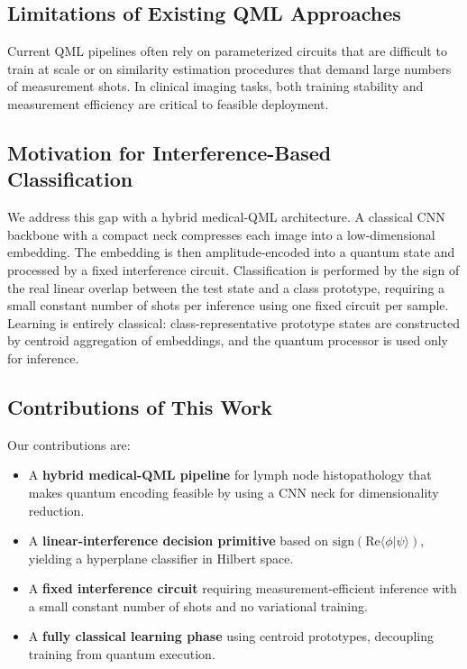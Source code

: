 \documentclass[conference]{IEEEtran}
\begin{document}
\subsection{Limitations of Existing QML Approaches}
Current QML pipelines often rely on parameterized circuits that are difficult to train at scale or on similarity estimation procedures that demand large numbers of measurement shots. In clinical imaging tasks, both training stability and measurement efficiency are critical to feasible deployment.

\subsection{Motivation for Interference-Based Classification}
We address this gap with a hybrid medical-QML architecture. A classical CNN backbone with a compact neck compresses each image into a low-dimensional embedding. The embedding is then amplitude-encoded into a quantum state and processed by a fixed interference circuit. Classification is performed by the sign of the real linear overlap between the test state and a class prototype, requiring a small constant number of shots per inference using one fixed circuit per sample. Learning is entirely classical: class-representative prototype states are constructed by centroid aggregation of embeddings, and the quantum processor is used only for inference.

\subsection{Contributions of This Work}
Our contributions are:
\begin{itemize}
    \item A \textbf{hybrid medical-QML pipeline} for lymph node histopathology that makes quantum encoding feasible by using a CNN neck for dimensionality reduction.
    \item A \textbf{linear-interference decision primitive} based on $\mathrm{sign}(\mathrm{Re}\langle\phi|\psi\rangle)$, yielding a hyperplane classifier in Hilbert space.
    \item A \textbf{fixed interference circuit} requiring measurement-efficient inference with a small constant number of shots and no variational training.
    \item A \textbf{fully classical learning phase} using centroid prototypes, decoupling training from quantum execution.
\end{itemize}
\end{document}
